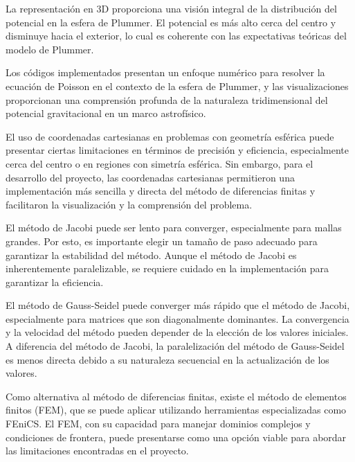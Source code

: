 \documentclass[reprint,amsmath,amssymb,aps]{revtex4-1}
\begin{document}
La representación en 3D proporciona una visión integral de la distribución del potencial en la esfera de Plummer. El potencial es más alto cerca del centro y disminuye hacia el exterior, lo cual es coherente con las expectativas teóricas del modelo de Plummer.

Los códigos implementados presentan un enfoque numérico para resolver la ecuación de Poisson en el contexto de la esfera de Plummer, y las visualizaciones proporcionan una comprensión profunda de la naturaleza tridimensional del potencial gravitacional en un marco astrofísico.

El uso de coordenadas cartesianas en problemas con geometría esférica puede presentar ciertas limitaciones en términos de precisión y eficiencia, especialmente cerca del centro o en regiones con simetría esférica. Sin embargo, para el desarrollo del proyecto, las coordenadas cartesianas permitieron una implementación más sencilla y directa del método de diferencias finitas y facilitaron la visualización y la comprensión del problema.

El método de Jacobi puede ser lento para converger, especialmente para mallas grandes. Por esto, es importante elegir un tamaño de paso adecuado para garantizar la estabilidad del método. Aunque el método de Jacobi es inherentemente paralelizable, se requiere cuidado en la implementación para garantizar la eficiencia.

El método de Gauss-Seidel puede converger más rápido que el método de Jacobi, especialmente para matrices que son diagonalmente dominantes. La convergencia y la velocidad del método pueden depender de la elección de los valores iniciales. A diferencia del método de Jacobi, la paralelización del método de Gauss-Seidel es menos directa debido a su naturaleza secuencial en la actualización de los valores.

Como alternativa al método de diferencias finitas, existe el método de elementos finitos (FEM), que se puede aplicar utilizando herramientas especializadas como FEniCS. El FEM, con su capacidad para manejar dominios complejos y condiciones de frontera, puede presentarse como una opción viable para abordar las limitaciones encontradas en el proyecto.



\end{document}
